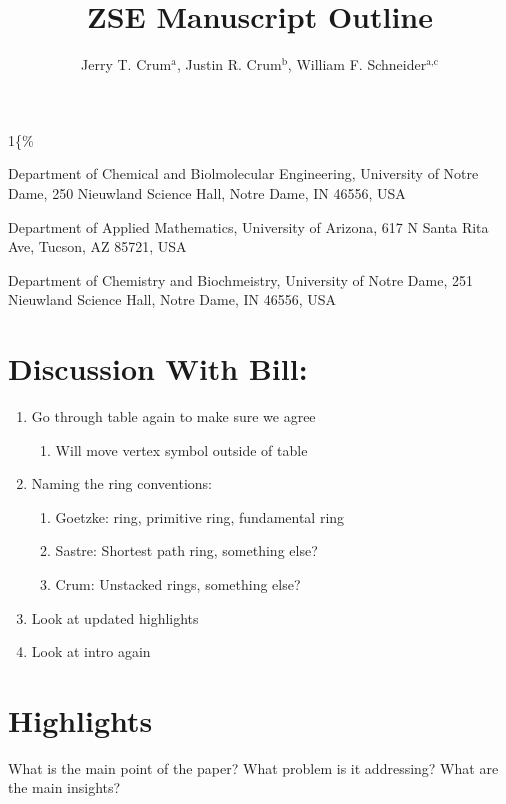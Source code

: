 \documentclass[11pt]{article}
\author{Jerry T. Crum\(^{\text{a}}\), Justin R. Crum\(^{\text{b}}\), William F. Schneider\(^{\text{a,c}}\)}
\date{}
\title{ZSE Manuscript Outline}
\begin{document}
\begin{OPTIONS}
\def\udesoftecoverride\#1\mainmatter\{\%
  \AfterEndPreamble{#1\mainmatter}
\end{OPTIONS}

\maketitle

\begin{asparaenum}[\expandafter\textsuperscript a ]
\item Department of Chemical and Biolmolecular Engineering, University of Notre Dame, 250 Nieuwland Science Hall, Notre Dame, IN 46556, USA \\
\item Department of Applied Mathematics, University of Arizona, 617 N Santa Rita Ave, Tucson, AZ 85721, USA\\
\item Department of Chemistry and Biochmeistry, University of Notre Dame, 251 Nieuwland Science Hall, Notre Dame, IN 46556, USA
\end{asparaenum}

\newpage
\section*{Discussion With Bill:}
\label{sec:orgecb832f}
\begin{enumerate}
\item Go through table again to make sure we agree
\begin{enumerate}
\item Will move vertex symbol outside of table
\end{enumerate}
\item Naming the ring conventions:
\begin{enumerate}
\item Goetzke: ring, primitive ring, fundamental ring \cite{marians-network-1990,guttman-ring-1990,goetzke-properties-1991}
\item Sastre: Shortest path ring, something else?
\item Crum: Unstacked rings, something else?
\end{enumerate}
\item Look at updated highlights
\item Look at intro again
\end{enumerate}

\section*{Highlights}
\label{sec:orgf8dc093}
What is the main point of the paper? What problem is it addressing? What are the main insights?
\end{document}
